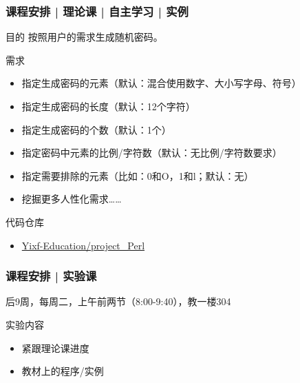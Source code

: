 \begin{frame}
  \frametitle{课程安排 | 理论课 | 自主学习 | 实例}
  \begin{block}{目的}
    按照用户的需求生成随机密码。
  \end{block}
  \pause
  \begin{block}{需求}
    \begin{itemize}
      \item 指定生成密码的元素（默认：混合使用数字、大小写字母、符号）
      \item 指定生成密码的长度（默认：12个字符）
      \item 指定生成密码的个数（默认：1个）
      \item 指定密码中元素的比例/字符数（默认：无比例/字符数要求）
      \item 指定需要排除的元素（比如：0和O，1和l；默认：无）
      \item 挖掘更多人性化需求……
    \end{itemize}
  \end{block}
  \pause
  \begin{block}{代码仓库}
    \begin{itemize}
      \item \href{https://github.com/Yixf-Education/project_Perl}{Yixf-Education/project\_Perl}
    \end{itemize}
  \end{block}
\end{frame}

\begin{frame}
  \frametitle{课程安排 | 实验课}
  \begin{center}
  \alert{后9周，每周二，上午前两节（8:00-9:40），教一楼304}\\
  \vspace{0.2cm}
  \end{center}
  \begin{block}{实验内容}
    \begin{itemize}
      \item 紧跟理论课进度
      \item 教材上的程序/实例
    \end{itemize}
  \end{block}
\end{frame}

